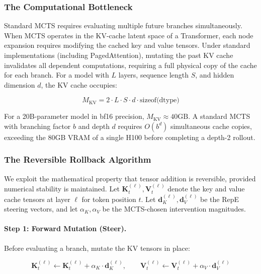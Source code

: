 \documentclass[10pt]{article}
\begin{document}
\subsubsection{The Computational Bottleneck}

Standard MCTS requires evaluating multiple future branches simultaneously. When MCTS operates in the KV-cache latent space of a Transformer, each node expansion requires modifying the cached key and value tensors. Under standard implementations (including PagedAttention), mutating the past KV cache invalidates all dependent computations, requiring a full physical copy of the cache for each branch. For a model with $L$ layers, sequence length $S$, and hidden dimension $d$, the KV cache occupies:

\begin{equation}
M_{\text{KV}} = 2 \cdot L \cdot S \cdot d \cdot \text{sizeof(dtype)}
\label{eq:kv_memory}
\end{equation}

For a 20B-parameter model in bf16 precision, $M_{\text{KV}} \approx 40\text{GB}$. A standard MCTS with branching factor $b$ and depth $d$ requires $O(b^d)$ simultaneous cache copies, exceeding the 80GB VRAM of a single H100 before completing a depth-2 rollout.

\subsubsection{The Reversible Rollback Algorithm}

We exploit the mathematical property that tensor addition is reversible, provided numerical stability is maintained. Let $\mathbf{K}_t^{(\ell)}, \mathbf{V}_t^{(\ell)}$ denote the key and value cache tensors at layer $\ell$ for token position $t$. Let $\mathbf{d}_K^{(\ell)}, \mathbf{d}_V^{(\ell)}$ be the RepE steering vectors, and let $\alpha_K, \alpha_V$ be the MCTS-chosen intervention magnitudes.

\paragraph{Step 1: Forward Mutation (Steer).} Before evaluating a branch, mutate the KV tensors in place:

\begin{equation}
\mathbf{K}_t^{(\ell)} \leftarrow \mathbf{K}_t^{(\ell)} + \alpha_K \cdot \mathbf{d}_K^{(\ell)}, \qquad \mathbf{V}_t^{(\ell)} \leftarrow \mathbf{V}_t^{(\ell)} + \alpha_V \cdot \mathbf{d}_V^{(\ell)}
\label{eq:forward_mutation}
\end{equation}
\end{document}
